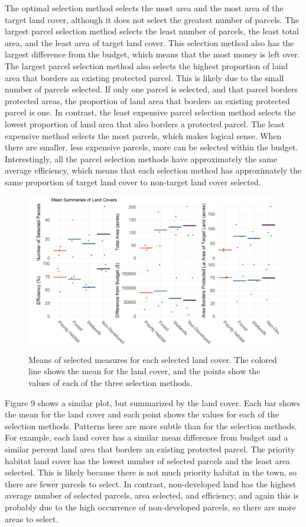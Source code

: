 \documentclass[12pt, stu, floatsintext,table]{apa7}
\begin{document}
The optimal selection method selects the most area and the most area of the target land cover, although it does not select the greatest number of parcels. The largest parcel selection method selects the least number of parcels, the least total area, and the least area of target land cover. This selection method also has the largest difference from the budget, which means that the most money is left over. The largest parcel selection method also selects the highest proportion of land area that borders an existing protected parcel. This is likely due to the small number of parcels selected. If only one parcel is selected, and that parcel borders protected areas, the proportion of land area that borders an existing protected parcel is one. In contrast, the least expensive parcel selection method selects the lowest proportion of land area that also borders a protected parcel. The least expensive method selects the most parcels, which makes logical sense. When there are smaller, less expensive parcels, more can be selected within the budget. Interestingly, all the parcel selection methods have approximately the same average efficiency, which means that each selection method has approximately the same proportion of target land cover to non-target land cover selected. 

\begin{figure}[hbtp]
    \centering
    \includegraphics[width = \textwidth]{figures/summary_lc.png}
    \caption{Means of selected measures for each selected land cover. The colored line shows the mean for the land cover, and the points show the values of each of the three selection methods.}
\end{figure}
Figure 9 shows a similar plot, but summarized by the land cover. Each bar shows the mean for the land cover and each point shows the values for each of the selection methods. Patterns here are more subtle than for the selection methods. For example, each land cover has a similar mean difference from budget and a similar percent land area that borders an existing protected parcel. The priority habitat land cover has the lowest number of selected parcels and the least area selected. This is likely because there is not much priority habitat in the town, so there are fewer parcels to select. In contrast, non-developed land has the highest average number of selected parcels, area selected, and efficiency, and again this is probably due to the high occurrence of non-developed parcels, so there are more areas to select. 
\end{document}
